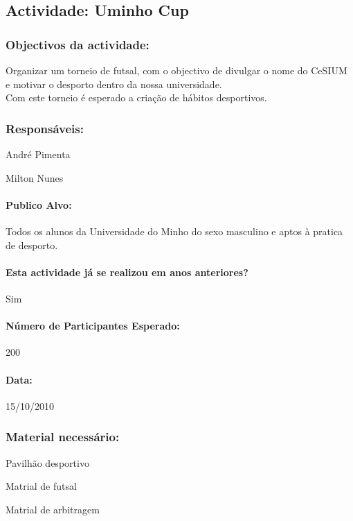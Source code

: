 \subsection{Actividade: Uminho Cup} %

\subsubsection*{Objectivos da actividade:}
Organizar um torneio de futsal, com o objectivo de divulgar o nome do CeSIUM e motivar o desporto dentro da nossa universidade.\\
Com este torneio é esperado a criação de hábitos desportivos.

\subsubsection*{Responsáveis:}
\begin{itemizedash}
	\item{André Pimenta}
	\item{Milton Nunes}
\end{itemizedash}

\paragraph{Publico Alvo: }
Todos os alunos da Universidade do Minho do sexo masculino e aptos à pratica de desporto.

\paragraph{Esta actividade já se realizou em anos anteriores?}
Sim

\paragraph{Número de Participantes Esperado:}
200

\paragraph{Data:} 15/10/2010

\subsubsection*{Material necessário:}
\begin{itemizedash}
	\item{Pavilhão desportivo}
	\item{Matrial de futsal}
	\item{Matrial de arbitragem}
\end{itemizedash}

